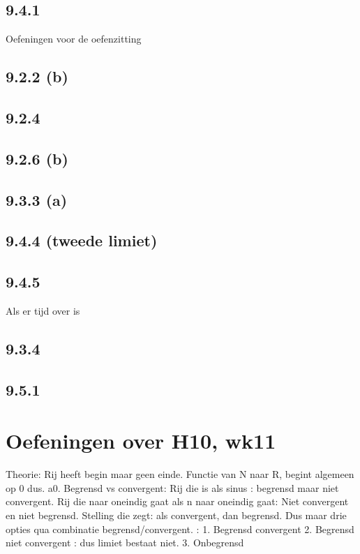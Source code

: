 \documentclass{article}
\begin{document}
\subsection{9.4.1} 



Oefeningen voor de oefenzitting 

\subsection{9.2.2 (b)}

\subsection{9.2.4}

\subsection{9.2.6 (b)}

\subsection{9.3.3 (a)}

\subsection{9.4.4 (tweede limiet)}

\subsection{9.4.5 }

Als er tijd over is 

\subsection{9.3.4}

\subsection{9.5.1}


\section{Oefeningen over H10, wk11}

Theorie: 
Rij heeft begin maar geen einde. Functie van N naar R, begint algemeen op 0 dus. a0.
Begrensd vs convergent: 
Rij die is als sinus : begrensd maar niet convergent. 
Rij die naar oneindig gaat als n naar oneindig gaat: 
Niet convergent en niet begrensd. 
Stelling die zegt: als convergent, dan begrensd. 
Dus maar drie opties qua combinatie begrensd/convergent. : 
1. Begrensd convergent
2. Begrensd niet convergent : dus limiet bestaat niet. 
3. Onbegrensd 
\end{document}
